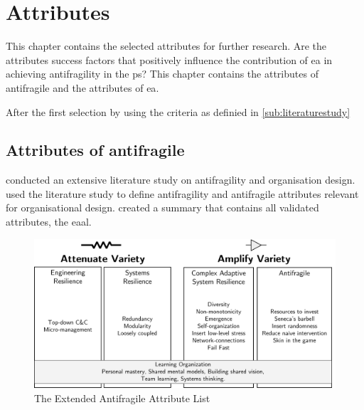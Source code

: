 \chapter{Attributes}
\label{ch:attributes}
This chapter contains the selected \glspl{attribute} for further research. Are the \glspl{attribute} success factors that positively influence the contribution of \acrlong{ea} in achieving \gls{antifragility} in the \gls{ps}? This chapter contains the attributes of \gls{antifragile} and the attributes of \acrlong{ea}. 

After the first selection by using the criteria as definied in \cref{sub:literaturestudy}
\section{Attributes of antifragile}
\label{sec:attributesofantifragile}
\label{sec:attributesantifragile}
\label{sub:attributeseaal}
\textcites{Botjes2020}{Botjes2021} conducted an extensive literature study on \gls{antifragility} and organisation design. \textcites{Botjes2020}{Botjes2021} used the literature study to define \gls{antifragility} and \gls{antifragile} \glspl{attribute} relevant for organisational design. \textcite[Fig.~8]{Botjes2021} created a summary that contains all validated attributes, the \acrlong{eaal}.
\begin{figure}[H]
	\centering
	\includegraphics[width=0.8\linewidth]{images/eaalbw}
	\caption[The Extended Antifragile Attribute List \parencite{Botjes2021}]{The Extended Antifragile Attribute List \parencite{Botjes2021}}
	\label{fig:eaalbw}
\end{figure}

